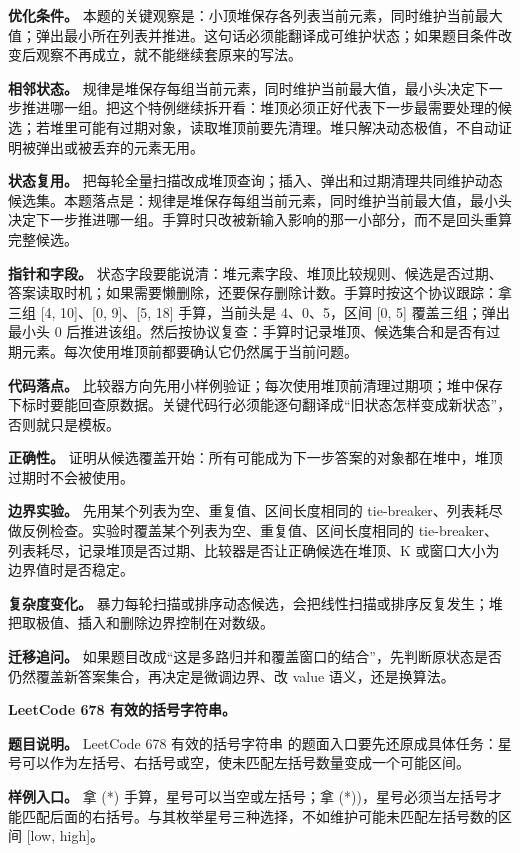 \textbf{优化条件。} 本题的关键观察是：小顶堆保存各列表当前元素，同时维护当前最大值；弹出最小所在列表并推进。这句话必须能翻译成可维护状态；如果题目条件改变后观察不再成立，就不能继续套原来的写法。

\textbf{相邻状态。} 规律是堆保存每组当前元素，同时维护当前最大值，最小头决定下一步推进哪一组。把这个特例继续拆开看：堆顶必须正好代表下一步最需要处理的候选；若堆里可能有过期对象，读取堆顶前要先清理。堆只解决动态极值，不自动证明被弹出或被丢弃的元素无用。

\textbf{状态复用。} 把每轮全量扫描改成堆顶查询；插入、弹出和过期清理共同维护动态候选集。本题落点是：规律是堆保存每组当前元素，同时维护当前最大值，最小头决定下一步推进哪一组。手算时只改被新输入影响的那一小部分，而不是回头重算完整候选。

\textbf{指针和字段。} 状态字段要能说清：堆元素字段、堆顶比较规则、候选是否过期、答案读取时机；如果需要懒删除，还要保存删除计数。手算时按这个协议跟踪：拿三组 [4, 10]、[0, 9]、[5, 18] 手算，当前头是 4、0、5，区间 [0, 5] 覆盖三组；弹出最小头 0 后推进该组。然后按协议复查：手算时记录堆顶、候选集合和是否有过期元素。每次使用堆顶前都要确认它仍然属于当前问题。

\textbf{代码落点。} 比较器方向先用小样例验证；每次使用堆顶前清理过期项；堆中保存下标时要能回查原数据。关键代码行必须能逐句翻译成“旧状态怎样变成新状态”，否则就只是模板。

\textbf{正确性。} 证明从候选覆盖开始：所有可能成为下一步答案的对象都在堆中，堆顶过期时不会被使用。

\textbf{边界实验。} 先用某个列表为空、重复值、区间长度相同的 tie-breaker、列表耗尽做反例检查。实验时覆盖某个列表为空、重复值、区间长度相同的 tie-breaker、列表耗尽，记录堆顶是否过期、比较器是否让正确候选在堆顶、K 或窗口大小为边界值时是否稳定。

\textbf{复杂度变化。} 暴力每轮扫描或排序动态候选，会把线性扫描或排序反复发生；堆把取极值、插入和删除边界控制在对数级。

\textbf{迁移追问。} 如果题目改成“这是多路归并和覆盖窗口的结合”，先判断原状态是否仍然覆盖新答案集合，再决定是微调边界、改 value 语义，还是换算法。

\noindent\textbf{LeetCode 678 有效的括号字符串。}

\textbf{题目说明。} LeetCode 678 有效的括号字符串 的题面入口要先还原成具体任务：星号可以作为左括号、右括号或空，使未匹配左括号数量变成一个可能区间。

\textbf{样例入口。} 拿 (*) 手算，星号可以当空或左括号；拿 (*))，星号必须当左括号才能匹配后面的右括号。与其枚举星号三种选择，不如维护可能未匹配左括号数的区间 [low, high]。


